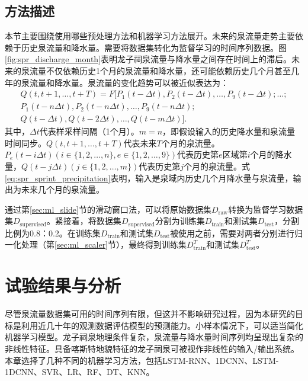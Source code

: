 \subsection{方法描述}\label{sec:spr_method}

本节主要围绕使用哪些预处理方法和机器学习方法展开。未来的泉流量走势主要依赖于历史泉流量和降水量。需要将数据集转化为监督学习的时间序列数据。图\ref{fig:spr_discharge_month}表明龙子祠泉流量与降水量之间存在时间上的滞后。未来的泉流量不仅依赖历史1个月的泉流量和降水量，还可能依赖历史几个月甚至几年的泉流量和降水量。泉流量的变化趋势可以被近似表达为：
\begin{equation}
  \label{eq:spr_sprint_precipitation}
  \begin{split}
    Q(t,t+1,\ldots,t+T)=F[P_1(t-\Delta t),P_2(t-\Delta t),\ldots,P_9(t-\Delta t);\ldots;\\
    P_1(t-n\Delta t),P_2(t-n\Delta t),\ldots,P_9(t-n\Delta t);\\
    Q(t-\Delta t),Q(t-2\Delta t),\ldots,Q(t-m\Delta t)].
  \end{split}
\end{equation}
其中，$\Delta t$代表样采样间隔（1个月）。$m=n$，即假设输入的历史降水量和泉流量时间同步。$Q(t,t+1,\ldots,t+T)$代表未来$T$个月的泉流量。$P_e(t-i\Delta t)(i\in\{1,2,\ldots,n\},e\in\{1,2,\ldots,9\})$代表历史第$e$区域第$i$个月的降水量，$Q(t-j\Delta t)(j\in\{1,2,\ldots,m\})$代表历史第$j$个月的泉流量。式\ref{eq:spr_sprint_precipitation}表明，输入是泉域内历史几个月降水量与泉流量，输出为未来几个月的泉流量。

通过第\ref{sec:ml_slide}节的滑动窗口法，可以将原始数据集$D_{\text{raw}}$转换为监督学习数据集$D_{\text{supervised}}$。紧接着，将数据集$D_{\text{supervised}}$分割为训练集$D_{\text{train}}$和测试集$D_{\text{test}}$，分割比例为0.8：0.2。在训练集$D_{\text{train}}$和测试集$D_{\text{test}}$被使用之前，需要对两者分别进行归一化处理（第\ref{sec:ml_scaler}节），最终得到训练集$D^T_{\text{train}}$和测试集$D^T_{\text{test}}$。

\section{试验结果与分析}\label{sec:spr_result}

尽管泉流量数据集可用的时间序列有限，但这并不影响研究过程，因为本研究的目标是利用近几十年的观测数据评估模型的预测能力。小样本情况下，可以适当简化机器学习模型。龙子祠泉地理条件复杂，泉流量与降水量时间序列均呈现出复杂的非线性特征。具备喀斯特地貌特征的龙子祠泉可被视作非线性的输入/输出系统。本章选择了几种不同的机器学习方法，包括LSTM-RNN、1DCNN、LSTM-1DCNN、SVR、LR、RF、DT、KNN。

